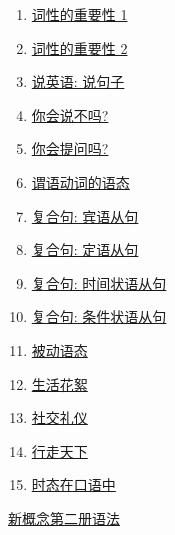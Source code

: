 \documentclass[11pt]{article}
\begin{document}
\begin{multicols}{3}
	\begin{enumerate}
		\item \href{https://mp.weixin.qq.com/s/3WM_W5zBpIB59raEoOt3pQ}{词性的重要性 1}	%
		\item \href{https://mp.weixin.qq.com/s/IbPvXBe58mFlYIBMHt4cEQ}{词性的重要性 2}	%
		\item \href{https://mp.weixin.qq.com/s/WRU8RXXP6xjNVvMHbSl7wA}{说英语: 说句子}	%
		\item \href{https://mp.weixin.qq.com/s/UZ36CbTLl3eBo4vIOY3W5g}{你会说不吗?}	%
		\item \href{https://mp.weixin.qq.com/s/sSmRuvsM-eUFGDdJb2kfUQ}{你会提问吗?}	%
		\item \href{https://mp.weixin.qq.com/s/dEN7BIhr8ez6CMReZACNgw}{谓语动词的语态}	%
		\item \href{https://mp.weixin.qq.com/s/eN1epuVIURDkiGlw-wrB4g}{复合句: 宾语从句}	%
		\item \href{https://mp.weixin.qq.com/s/LDyGno3hzV2SExpou-lvkA}{复合句: 定语从句}	%
		\item \href{https://mp.weixin.qq.com/s/J3ZFp06j4SAVrPOlmJb_-w}{复合句: 时间状语从句}	%
		\item \href{https://mp.weixin.qq.com/s/dLETduZhmil4c9pZz-nkwg}{复合句: 条件状语从句}	%
		\item \href{https://mp.weixin.qq.com/s/THvzFf62yzMOr_miE868Yw}{被动语态}	%
		\item \href{https://mp.weixin.qq.com/s/N5r3wv9vbKfMOSoMF66-XQ}{生活花絮}	%
		\item \href{https://mp.weixin.qq.com/s/wGHaWVpP-iTUWqOd2P86Uw}{社交礼仪}	%
		\item \href{https://mp.weixin.qq.com/s/0uKhnYAsnFjhLVS_6wYfrQ}{行走天下}	%
		\item \href{https://mp.weixin.qq.com/s/HkDcTBGcb1V_nWk-dXuKbQ}{时态在口语中}	%
	\end{enumerate}
	
\end{multicols}

\begin{center}
	{\large \href{https://www.youtube.com/playlist?list=PLK6q4vrvWZiOiNyAXtCd8gQhro9P4o34X}{新概念第二册语法}} %
\end{center}
\end{document}
